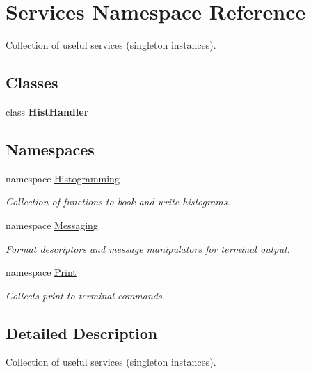 \hypertarget{namespaceServices}{
\section{Services Namespace Reference}
\label{namespaceServices}
}
Collection of useful services (singleton instances).  


\subsection*{Classes}
\begin{CompactItemize}
\item 
class \textbf{Hist\-Handler}
\end{CompactItemize}
\subsection*{Namespaces}
\begin{CompactItemize}
\item 
namespace \hyperlink{namespaceServices_1_1Histogramming}{Histogramming}
\begin{CompactList}\small\item\em Collection of functions to book and write histograms. \item\end{CompactList}

\item 
namespace \hyperlink{namespaceServices_1_1Messaging}{Messaging}
\begin{CompactList}\small\item\em Format descriptors and message manipulators for terminal output. \item\end{CompactList}

\item 
namespace \hyperlink{namespaceServices_1_1Print}{Print}
\begin{CompactList}\small\item\em Collects print-to-terminal commands. \item\end{CompactList}

\end{CompactItemize}


\subsection{Detailed Description}
Collection of useful services (singleton instances). 
